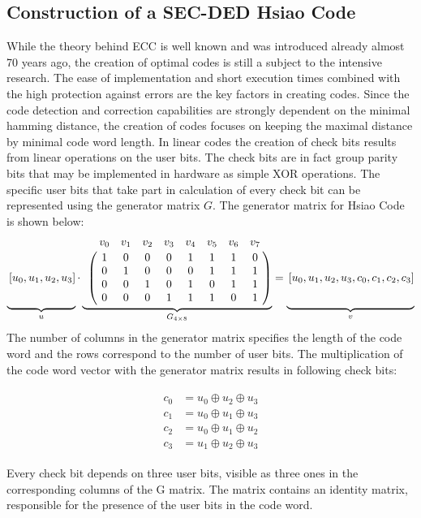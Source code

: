 \subsection{Construction of a SEC-DED Hsiao Code}
While the theory behind ECC is well known and was introduced already almost 70 years ago, the creation of optimal codes is still a subject to the intensive research. The ease of implementation and short execution times combined with the high protection against errors are the key factors in creating codes. Since the code detection and correction capabilities are strongly dependent on the minimal hamming distance, the creation of codes focuses on keeping the maximal distance by minimal code word length. In linear codes the creation of check bits results from linear operations on the user bits. The check bits are in fact group parity bits that may be implemented in hardware as simple XOR operations. The specific user bits that take part in calculation of every check bit can be represented using the generator matrix $G$. The generator matrix for Hsiao Code is shown below:
\begin{equation*}
\underbrace{
\vphantom{\bordermatrix{&&&&&&&&\cr &1&0&0&0&1&1&1&0\cr&0&1&0&0&0&1&1&1\cr&0&0&1&0&1&0&1&1\cr&0&0&0&1&1&1&0&1\cr}
}\left[u_0,u_1,u_2,u_3 \right ]}_{u}
\cdot 
\underbrace{\bordermatrix{
&v_0&v_1&v_2&v_3&v_4&v_5&v_6&v_7\cr 
&1&0&0&0&1&1&1&0\cr
&0&1&0&0&0&1&1&1\cr
&0&0&1&0&1&0&1&1\cr
&0&0&0&1&1&1&0&1\cr
}}_{G_{4\times 8}} = 
\underbrace{
\vphantom{\bordermatrix{&&&&&&&&\cr &1&0&0&0&1&1&1&0\cr&0&1&0&0&0&1&1&1\cr&0&0&1&0&1&0&1&1\cr&0&0&0&1&1&1&0&1\cr}
}\left[u_0,u_1,u_2,u_3,c_0,c_1,c_2,c_3 \right ]}_{v}
\end{equation*}
The number of columns in the generator matrix specifies the length of the code word and the rows correspond to the number of user bits. The multiplication of the code word vector with the generator matrix results in following check bits: 

\begin{align}
\begin{aligned}
c_0 &= u_0 \oplus u_2 \oplus u_3  \\
c_1 &= u_0 \oplus u_1 \oplus u_3  \\
c_2 &= u_0 \oplus u_1 \oplus u_2  \\
c_3 &= u_1 \oplus u_2 \oplus u_3 
\end{aligned}
\end{align}

Every check bit depends on three user bits, visible as three ones in the corresponding columns of the G matrix. The matrix contains an identity matrix, responsible for the presence of the user bits in the code word.

